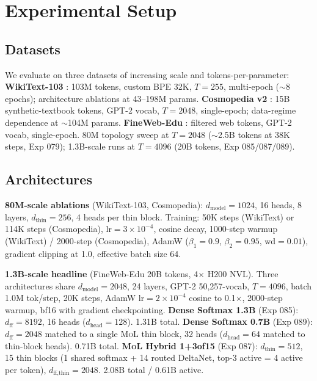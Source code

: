\documentclass[10pt]{article}
\newcommand{\mol}{\textsc{MoL}}
\newcommand{\dmodel}{d_\text{model}}
\newcommand{\dthin}{d_\text{thin}}
\newcommand{\Paragraph}[1]{\vspace{0.5em}\noindent\textbf{#1}}
\begin{document}
\section{Experimental Setup}
\label{sec:setup}

\subsection{Datasets}

We evaluate on three datasets of increasing scale and tokens-per-parameter:
\textbf{WikiText-103} \citep{merity2017pointer}: 103M tokens, custom BPE 32K, $T{=}255$, multi-epoch ($\sim$8 epochs); architecture ablations at 43--198M params.
\textbf{Cosmopedia v2} \citep{benallal2024cosmopedia}: 15B synthetic-textbook tokens, GPT-2 vocab, $T{=}2048$, single-epoch; data-regime dependence at $\sim$104M params.
\textbf{FineWeb-Edu} \citep{penedo2024fineweb}: filtered web tokens, GPT-2 vocab, single-epoch. 80M topology sweep at $T{=}2048$ ($\sim$2.5B tokens at 38K steps, Exp 079); 1.3B-scale runs at $T{=}4096$ (20B tokens, Exp 085/087/089).

\subsection{Architectures}

\Paragraph{80M-scale ablations} (WikiText-103, Cosmopedia): $\dmodel{=}1024$, 16 heads, 8 layers, $\dthin{=}256$, 4 heads per thin block.
Training: 50K steps (WikiText) or 114K steps (Cosmopedia), lr$=3 \times 10^{-4}$, cosine decay, 1000-step warmup (WikiText) / 2000-step (Cosmopedia), AdamW ($\beta_1{=}0.9$, $\beta_2{=}0.95$, wd$=0.01$), gradient clipping at 1.0, effective batch size 64.

\Paragraph{1.3B-scale headline} (FineWeb-Edu 20B tokens, 4$\times$ H200 NVL).
Three architectures share $d_\textrm{model}{=}2048$, 24 layers, GPT-2 50,257-vocab, $T{=}4096$, batch 1.0M tok/step, 20K steps, AdamW lr$=2\times 10^{-4}$ cosine to 0.1$\times$, 2000-step warmup, bf16 with gradient checkpointing.
\textbf{Dense Softmax 1.3B} (Exp 085): $d_\textrm{ff}{=}8192$, 16 heads ($d_\textrm{head}{=}128$). 1.31B total.
\textbf{Dense Softmax 0.7B} (Exp 089): $d_\textrm{ff}{=}2048$ matched to a single \mol{} thin block, 32 heads ($d_\textrm{head}{=}64$ matched to thin-block heads). 0.71B total.
\textbf{\mol{} Hybrid 1+3of15} (Exp 087): $\dthin{=}512$, 15 thin blocks (1 shared softmax + 14 routed DeltaNet, top-3 active = 4 active per token), $d_\textrm{ff,thin}{=}2048$. 2.08B total / 0.61B active.
\end{document}
